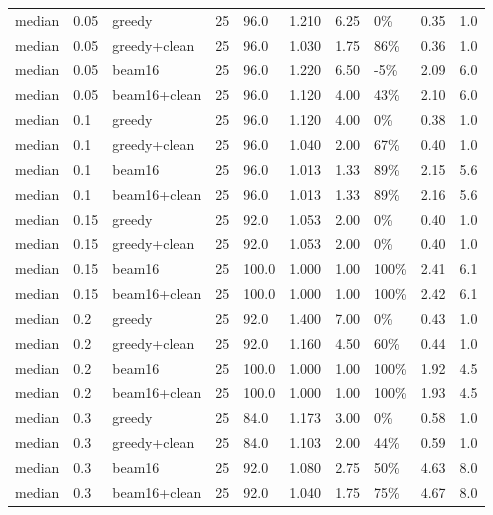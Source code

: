 \begin{table}[t]
\begin{tabular}{llllllllll}
median & 0.05 & greedy & 25 & 96.0 & 1.210 & 6.25 & 0\% & 0.35 & 1.0 \\
median & 0.05 & greedy+clean & 25 & 96.0 & 1.030 & 1.75 & 86\% & 0.36 & 1.0 \\
median & 0.05 & beam16 & 25 & 96.0 & 1.220 & 6.50 & -5\% & 2.09 & 6.0 \\
median & 0.05 & beam16+clean & 25 & 96.0 & 1.120 & 4.00 & 43\% & 2.10 & 6.0 \\
median & 0.1 & greedy & 25 & 96.0 & 1.120 & 4.00 & 0\% & 0.38 & 1.0 \\
median & 0.1 & greedy+clean & 25 & 96.0 & 1.040 & 2.00 & 67\% & 0.40 & 1.0 \\
median & 0.1 & beam16 & 25 & 96.0 & 1.013 & 1.33 & 89\% & 2.15 & 5.6 \\
median & 0.1 & beam16+clean & 25 & 96.0 & 1.013 & 1.33 & 89\% & 2.16 & 5.6 \\
median & 0.15 & greedy & 25 & 92.0 & 1.053 & 2.00 & 0\% & 0.40 & 1.0 \\
median & 0.15 & greedy+clean & 25 & 92.0 & 1.053 & 2.00 & 0\% & 0.40 & 1.0 \\
median & 0.15 & beam16 & 25 & 100.0 & 1.000 & 1.00 & 100\% & 2.41 & 6.1 \\
median & 0.15 & beam16+clean & 25 & 100.0 & 1.000 & 1.00 & 100\% & 2.42 & 6.1 \\
median & 0.2 & greedy & 25 & 92.0 & 1.400 & 7.00 & 0\% & 0.43 & 1.0 \\
median & 0.2 & greedy+clean & 25 & 92.0 & 1.160 & 4.50 & 60\% & 0.44 & 1.0 \\
median & 0.2 & beam16 & 25 & 100.0 & 1.000 & 1.00 & 100\% & 1.92 & 4.5 \\
median & 0.2 & beam16+clean & 25 & 100.0 & 1.000 & 1.00 & 100\% & 1.93 & 4.5 \\
median & 0.3 & greedy & 25 & 84.0 & 1.173 & 3.00 & 0\% & 0.58 & 1.0 \\
median & 0.3 & greedy+clean & 25 & 84.0 & 1.103 & 2.00 & 44\% & 0.59 & 1.0 \\
median & 0.3 & beam16 & 25 & 92.0 & 1.080 & 2.75 & 50\% & 4.63 & 8.0 \\
median & 0.3 & beam16+clean & 25 & 92.0 & 1.040 & 1.75 & 75\% & 4.67 & 8.0 \\
\bottomrule
\end{tabular}\end{table}

